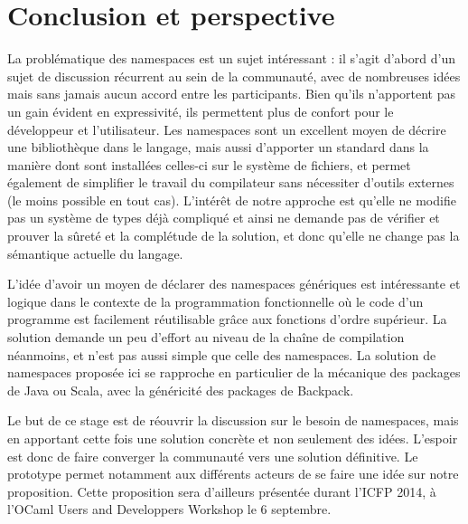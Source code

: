 \documentclass[11pt,a4paper]{report}
\begin{document}

\chapter{Conclusion et perspective}

La problématique des namespaces est un sujet intéressant : il s'agit d'abord
d'un sujet de discussion récurrent au sein de la communauté, avec de nombreuses
idées mais sans jamais aucun accord entre les participants. Bien qu'ils n'apportent
pas un gain évident en expressivité, ils permettent plus de confort pour le
développeur et l'utilisateur. Les namespaces sont un excellent moyen de décrire
une bibliothèque dans le langage, mais aussi d'apporter un standard dans la
manière dont sont installées celles-ci sur le système de fichiers, et permet
également de simplifier le travail du compilateur sans nécessiter d'outils
externes (le moins possible en tout cas). L'intérêt de notre approche est
qu'elle ne modifie pas un système de types déjà compliqué et ainsi ne demande
pas de vérifier et prouver la sûreté et la complétude de la solution, et donc
qu'elle ne change pas la sémantique actuelle du langage.

L'idée d'avoir un moyen de déclarer des namespaces génériques est intéressante
et logique dans le contexte de la programmation fonctionnelle où le code d'un
programme est facilement réutilisable grâce aux fonctions d'ordre supérieur. La
solution demande un peu d'effort au niveau de la chaîne de compilation
néanmoins, et n'est pas aussi simple que celle des namespaces. La solution de
namespaces proposée ici se rapproche en particulier de la mécanique des packages
de Java ou Scala, avec la généricité des packages de Backpack.

Le but de ce stage est de réouvrir la discussion sur le besoin de namespaces,
mais en apportant cette fois une solution concrète et non seulement des
idées. L'espoir est donc de faire converger la communauté vers une solution
définitive. Le prototype permet notamment aux différents acteurs de se faire une
idée sur notre proposition. Cette proposition sera d'ailleurs présentée durant
l'ICFP 2014, à l'OCaml Users and Developpers Workshop le 6 septembre.
\end{document}
